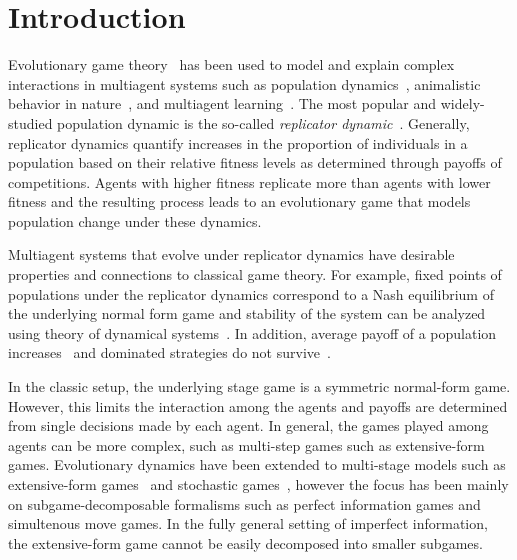 \documentclass{aamas2013}
\begin{document}
\section{Introduction}


Evolutionary game theory~\cite{MaynardSmith82,Gintis09} has been used to model and explain complex interactions in multiagent 
systems such as population dynamics~\cite{HS98}, animalistic behavior in nature~\cite{MSP73}, and 
multiagent learning~\cite{Tuyls07What,Tuyls03Selection}. The most popular and widely-studied population dynamic is the
so-called {\it replicator dynamic}~\cite{TJ78}. Generally, replicator dynamics quantify 
increases in the proportion of individuals in a population based on their relative fitness levels as determined through 
payoffs of competitions. Agents with higher fitness replicate more than agents with lower fitness and the resulting 
process leads to an evolutionary game that models population change under these dynamics. 

Multiagent systems that evolve under replicator dynamics have desirable properties and connections to classical game theory. 
For example, fixed points of populations under the replicator dynamics correspond to a Nash equilibrium of the underlying normal 
form game and stability of the system can be analyzed using theory of dynamical systems~\cite{Gintis09}. In addition, average payoff 
of a population increases~\cite{HS98} and dominated strategies do not survive~\cite{Gintis09}. 

In the classic setup, the underlying stage game is a symmetric normal-form game. However, this limits the interaction
among the agents and payoffs are determined from single decisions made by each agent. In general, the games played among agents 
can be more complex, such as multi-step games such as extensive-form games. Evolutionary dynamics have been extended to multi-stage 
models such as extensive-form games~\cite{Cressman03} and stochastic games~\cite{Flesch13Evolutionary}, 
however the focus has been mainly on subgame-decomposable formalisms such as perfect information games and
simultenous move games. In the fully general setting of imperfect information, the extensive-form game cannot be easily 
decomposed into smaller subgames. 
\end{document}
